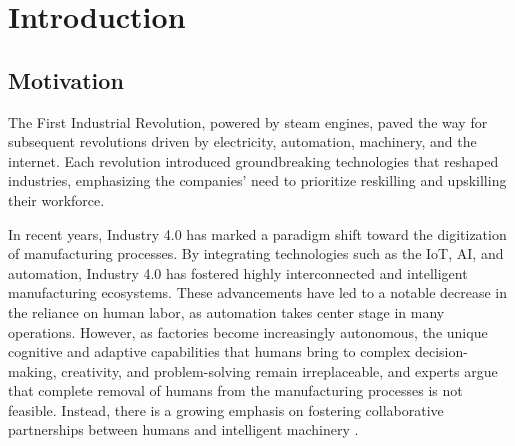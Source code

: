 \chapter{Introduction}%
\label{chapter:introduction}


\section{Motivation}
\label{section:Motivation}
% 
The First Industrial Revolution, powered by steam engines, paved the way for subsequent revolutions driven by electricity, automation, machinery, 
and the internet. Each revolution introduced groundbreaking technologies that reshaped industries, emphasizing the companies' need to prioritize reskilling 
and upskilling their workforce.

In recent years, Industry 4.0 has marked a paradigm shift toward the digitization of manufacturing processes. By integrating technologies such as the \ac{IoT}, \ac{AI}, and automation, Industry 4.0 has fostered highly interconnected and intelligent manufacturing ecosystems. These advancements have led to a notable decrease in the reliance on human labor, as automation takes center stage in many operations.
However, as factories become increasingly autonomous, the unique cognitive and adaptive capabilities that humans bring to complex decision-making, creativity, and problem-solving remain irreplaceable, and experts argue that complete removal of humans from the manufacturing processes is not feasible. Instead, there is a growing emphasis on fostering collaborative partnerships between humans and intelligent machinery \cite{Weiss2021}.

